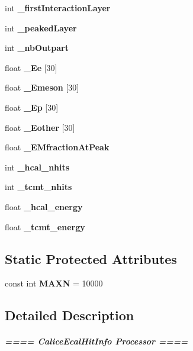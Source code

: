 \begin{CompactItemize}
\item 
int {\bf \_\-first\-Interaction\-Layer}\label{classCaliceEcalHitInfo_p50}

\item 
int {\bf \_\-peaked\-Layer}\label{classCaliceEcalHitInfo_p51}

\item 
int {\bf \_\-nb\-Outpart}\label{classCaliceEcalHitInfo_p52}

\item 
float {\bf \_\-Ee} [30]\label{classCaliceEcalHitInfo_p53}

\item 
float {\bf \_\-Emeson} [30]\label{classCaliceEcalHitInfo_p54}

\item 
float {\bf \_\-Ep} [30]\label{classCaliceEcalHitInfo_p55}

\item 
float {\bf \_\-Eother} [30]\label{classCaliceEcalHitInfo_p56}

\item 
float {\bf \_\-EMfraction\-At\-Peak}\label{classCaliceEcalHitInfo_p57}

\item 
int {\bf \_\-hcal\_\-nhits}\label{classCaliceEcalHitInfo_p58}

\item 
int {\bf \_\-tcmt\_\-nhits}\label{classCaliceEcalHitInfo_p59}

\item 
float {\bf \_\-hcal\_\-energy}\label{classCaliceEcalHitInfo_p60}

\item 
float {\bf \_\-tcmt\_\-energy}\label{classCaliceEcalHitInfo_p61}

\end{CompactItemize}
\subsection*{Static Protected Attributes}
\begin{CompactItemize}
\item 
const int {\bf MAXN} = 10000\label{classCaliceEcalHitInfo_t0}

\end{CompactItemize}


\subsection{Detailed Description}
\subparagraph*{==== Calice\-Ecal\-Hit\-Info Processor ==== }

